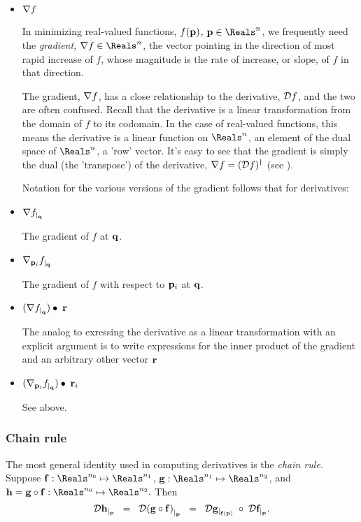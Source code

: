 \begin{itemize}

\item ${\mathbf \nabla}{f}$

In minimizing real-valued functions, $f({\mathbf p})$, $\p \in \Reals^n$,
we frequently need
the {\it gradient,} $\Ga{f} \in \Reals^n$,
the vector pointing in the direction of most rapid increase of $f$,
whose magnitude is the rate of increase, or slope,
of $f$ in that direction.

The gradient, ${\mathbf \nabla}{f}$,
has a close relationship to the derivative, ${\mathcal{D}{f}}$,
and the two are often confused.
Recall that the derivative is a linear transformation
from the domain of $f$ to its codomain.
In the case of real-valued functions,
this means the derivative is a linear function on $\Reals^n$,
an element of the dual space of $\Reals^n$, a 'row' vector.
It's easy to see that the gradient is simply the dual (the 'transpose')
of the derivative, ${\mathbf \nabla}{f} = ({\mathcal{D}{f}})^{\dagger}$
(see \cite[p. 96, ex. 4-18]{spivak-1965}).

Notation for the various versions of the gradient
follows that for derivatives:

\item ${\mathbf \nabla}{f}_{\mid_{{\mathbf q}}}$

The gradient of $f$ at ${\mathbf q}$.

\item ${\mathbf \nabla}_{{\mathbf p}_i}{{f}}_{\mid_{{\mathbf q}}}$

The gradient of $f$
with respect to ${\mathbf p}_i$ at ${\mathbf q}$.

\item $({\mathbf \nabla}{f}_{\mid_{{\mathbf q}}}) \bullet \; {\mathbf r}$

The analog to exressing the derivative as a linear transformation
with an explicit argument is to write expressions for
the inner product of the gradient and an arbitrary other vector ${\mathbf r}$

\item $({\mathbf \nabla}_{{\mathbf p}_i}{{f}}_{\mid_{{\mathbf q}}}) \bullet \;{\mathbf r}_i$

See above.

\end{itemize}



\subsubsection{Chain rule}
\label{sec:chain}

The most general identity used in computing derivatives is the {\it chain rule.}
Suppose
$\f:\Reals^{n_0} \mapsto \Reals^{n_1}$,
$\g:\Reals^{n_1} \mapsto \Reals^{n_2}$,
and
$\h = \g \circ \f : \Reals^{n_0} \mapsto \Reals^{n_2}.$
Then
\begin{equation}
\label{eq:chain-rule}
{\mathcal{D}{{\mathbf h}}_{\mid_{{\mathbf p}}}} \;\; = \;\; {\mathcal{D}{({\mathbf g} \circ {\mathbf f})}_{\mid_{{\mathbf p}}}}
            \;\; = \;\; {\mathcal{D}{{\mathbf g}}_{\mid_{{\mathbf f}({\mathbf p})}}} \; \circ \; {\mathcal{D}{{\mathbf f}}_{\mid_{{\mathbf p}}}}.
\end{equation}

